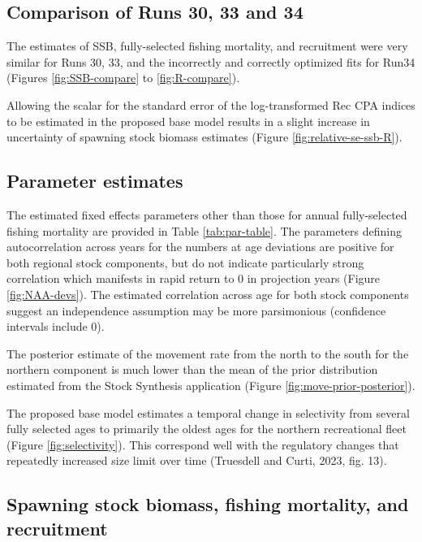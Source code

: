 \documentclass[
]{article}
\begin{document}
\hypertarget{comparison-of-runs-30-33-and-34}{%
\subsection{Comparison of Runs 30, 33 and 34}\label{comparison-of-runs-30-33-and-34}}

The estimates of SSB, fully-selected fishing mortality, and recruitment were very similar for Runs 30, 33, and the incorrectly and correctly optimized fits for Run34 (Figures \ref{fig:SSB-compare} to \ref{fig:R-compare}).

Allowing the scalar for the standard error of the log-transformed Rec CPA indices to be estimated in the proposed base model results in a slight increase in uncertainty of spawning stock biomass estimates (Figure \ref{fig:relative-se-ssb-R}).

\hypertarget{parameter-estimates}{%
\subsection{Parameter estimates}\label{parameter-estimates}}

The estimated fixed effects parameters other than those for annual fully-selected fishing mortality are provided in Table \ref{tab:par-table}. The parameters defining autocorrelation across years for the numbers at age deviations are positive for both regional stock components, but do not indicate particularly strong correlation which manifests in rapid return to 0 in projection years (Figure \ref{fig:NAA-devs}). The estimated correlation across age for both stock components suggest an independence assumption may be more parsimonious (confidence intervals include 0).

The posterior estimate of the movement rate from the north to the south for the northern component is much lower than the mean of the prior distribution estimated from the Stock Synthesis application (Figure \ref{fig:move-prior-posterior}).

The proposed base model estimates a temporal change in selectivity from several fully selected ages to primarily the oldest ages for the northern recreational fleet (Figure \ref{fig:selectivity}). This correspond well with the regulatory changes that repeatedly increased size limit over time (Truesdell and Curti, 2023, fig. 13).

\hypertarget{spawning-stock-biomass-fishing-mortality-and-recruitment}{%
\subsection{Spawning stock biomass, fishing mortality, and recruitment}\label{spawning-stock-biomass-fishing-mortality-and-recruitment}}
\end{document}
